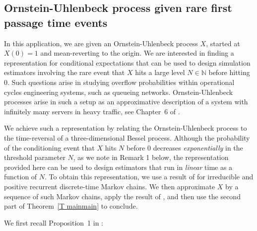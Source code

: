 \subsection{Ornstein-Uhlenbeck process given rare first passage time events}

In this application, we are given an Ornstein-Uhlenbeck process $X$, started at $X(0)=1$
and mean-reverting to the origin. We are interested in finding a representation for conditional expectations that can be used to design simulation estimators involving the rare event that $X$ hits a large level $N\in \mathbb{N}$ before hitting $0$. Such questions arise in studying
overflow probabilities within operational cycles engineering systems, such as queueing networks. 
Ornstein-Uhlenbeck processes arise in such a setup as an
approximative description of a system with infinitely many servers in heavy traffic, see Chapter~6 of \citet{Robert2003stochastic}.

We achieve such a representation by relating the Ornstein-Uhlenbeck process to the
time-reversal of a three-dimensional Bessel process. Although the
probability of the conditioning event that $X$ hits $N$ before $0$ decreases
\emph{exponentially} in the threshold parameter $N$, as we note in Remark 1 below, the representation provided here
can be used to design estimators that run in \emph{linear} time as a function of $N$. To obtain this representation, we
use a result of \citet{Blanchet2013} for irreducible and positive recurrent
discrete-time Markov chains. We then approximate $X$ by a sequence of such Markov chains,
apply the result of \citet{Blanchet2013}, and then use the second part of
Theorem~\ref{T mainmain} to conclude.

We first recall Proposition~1 in \citet{Blanchet2013}:

